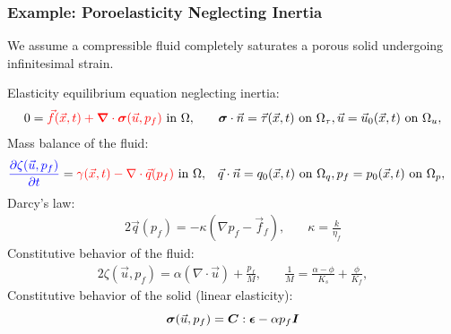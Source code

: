 \documentclass[aspectratio=169,hyperref=colorlinks]{beamer}
\begin{document}
\begin{frame}
  \frametitle{Example: Poroelasticity Neglecting Inertia}
  \summary{}

        We assume a compressible fluid completely saturates a porous
        solid undergoing infinitesimal strain.

        Elasticity equilibrium equation neglecting inertia:
        \begin{alignat}{2}
          0 &= {\color{red}\vec{f}(\vec{x},t) + \bm{\nabla} \cdot \bm{\sigma}(\vec{u},p_f)} \text{ in } \Omega, 
          & \quad
          \bm{\sigma} \cdot \vec{n} = \vec{\tau}(\vec{x},t) \text{ on } \Omega_\tau, 
          \vec{u} = \vec{u}_0(\vec{x},t) \text{ on } \Omega_u,
        \end{alignat}
        Mass balance of the fluid:
        \begin{alignat}{2}
          {\color{blue}\frac{\partial \zeta(\vec{u},p_f)}{\partial t}} = {\color{red}\gamma(\vec{x},t) - \nabla \cdot \vec{q}(p_f)} \text{ in }\Omega,
          & \quad
          \vec{q} \cdot \vec{n} = q_0(\vec{x},t) \text{ on }\Omega_q,
          p_f = p_0(\vec{x},t) \text{ on }\Omega_p,
        \end{alignat}
        Darcy's law:
        \begin{alignat}{2}
          \vec{q}(p_f) = -\kappa (\nabla p_f - \vec{f}_f), 
          & \quad
          \kappa = \frac{k}{\eta_f}
        \end{alignat}
        Constitutive behavior of the fluid:
        \begin{alignat}{2}
          \zeta(\vec{u},p_f) = \alpha (\nabla \cdot \vec{u}) + \frac{p_f}{M}, 
          & \quad
          \frac{1}{M} = \frac{\alpha-\phi}{K_s} + \frac{\phi}{K_f},
        \end{alignat}
        Constitutive behavior of the solid (linear elasticity):
        \begin{equation}
          \bm{\sigma}(\vec{u},p_f) = \bm{C} : \bm{\epsilon} - \alpha p_f \bm{I}
        \end{equation}


\end{frame}
\end{document}
